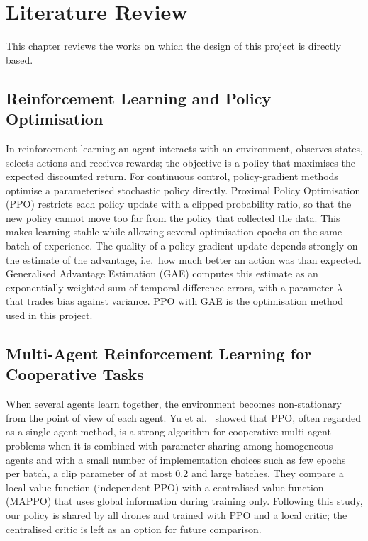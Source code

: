 \chapter{Literature Review}
\label{ch:literature}

This chapter reviews the works on which the design of this project is directly based.

\section{Reinforcement Learning and Policy Optimisation}
In reinforcement learning an agent interacts with an environment, observes states, selects actions and
receives rewards; the objective is a policy that maximises the expected discounted return. For continuous
control, policy-gradient methods optimise a parameterised stochastic policy directly. Proximal Policy
Optimisation (PPO) \cite{schulman2017proximal} restricts each policy update with a clipped probability ratio,
so that the new policy cannot move too far from the policy that collected the data. This makes learning stable
while allowing several optimisation epochs on the same batch of experience. The quality of a policy-gradient
update depends strongly on the estimate of the advantage, i.e.\ how much better an action was than expected.
Generalised Advantage Estimation (GAE) \cite{schulman2016gae} computes this estimate as an exponentially
weighted sum of temporal-difference errors, with a parameter $\lambda$ that trades bias against variance. PPO
with GAE is the optimisation method used in this project.

\section{Multi-Agent Reinforcement Learning for Cooperative Tasks}
When several agents learn together, the environment becomes non-stationary from the point of view of each agent.
Yu et al.\ \cite{yu2022surprising} showed that PPO, often regarded as a single-agent method, is a strong
algorithm for cooperative multi-agent problems when it is combined with parameter sharing among homogeneous
agents and with a small number of implementation choices such as few epochs per batch, a clip parameter of at
most 0.2 and large batches. They compare a local value function (independent PPO) with a centralised value
function (MAPPO) that uses global information during training only. Following this study, our policy is shared
by all drones and trained with PPO and a local critic; the centralised critic is left as an option for future
comparison.

